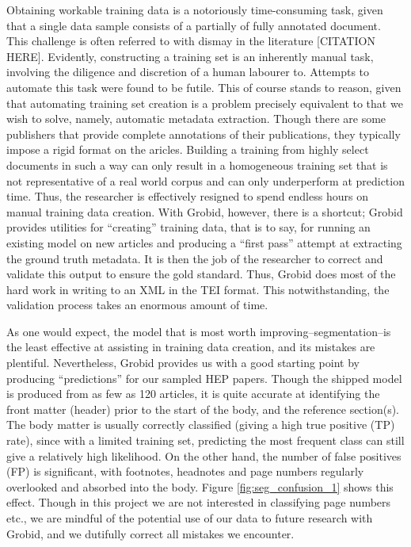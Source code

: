 \documentclass[11pt, oneside]{scrartcl}   	%
\begin{document}
Obtaining workable training data is a notoriously time-consuming task, given that a single data sample consists of a partially of fully annotated document. This challenge is often referred to with dismay in the literature [CITATION HERE]. Evidently, constructing a training set is an inherently manual task, involving the diligence and discretion of a human labourer to. Attempts to automate this task were found to be futile. This of course stands to reason, given that automating training set creation is a problem precisely equivalent to that we wish to solve, namely, automatic metadata extraction. Though there are some publishers that provide complete annotations of their publications, they typically impose a rigid format on the aricles. Building a training from highly select documents in such a way can only result in a homogeneous training set that is not representative of a real world corpus and can only underperform at prediction time. Thus, the researcher is effectively resigned to spend endless hours on manual training data creation. With Grobid, however, there is a shortcut; Grobid provides utilities for ``creating'' training data, that is to say, for running an existing model on new articles and producing a ``first pass'' attempt at extracting the ground truth metadata. It is then the job of the researcher to correct and validate this output to ensure the gold standard. Thus, Grobid does most of the hard work in writing to an XML in the TEI format. This notwithstanding, the validation process takes an enormous amount of time.

As one would expect, the model that is most worth improving--segmentation--is the least effective at assisting in training data creation, and its mistakes are plentiful. Nevertheless, Grobid provides us with a good starting point by producing ``predictions'' for our sampled HEP papers. Though the shipped model is produced from as few as 120 articles, it is quite accurate at identifying the front matter (header) prior to the start of the body, and the reference section(s). The body matter is usually correctly classified (giving a high true positive (TP) rate), since with a limited training set, predicting the most frequent class can still give a relatively high likelihood. On the other hand, the number of false positives (FP) is significant, with footnotes, headnotes and page numbers regularly overlooked and absorbed into the body. Figure \ref{fig:seg_confusion_1} shows this effect. Though in this project we are not interested in classifying page numbers etc., we are mindful of the potential use of our data to future research with Grobid, and we dutifully correct all mistakes we encounter.
\end{document}
